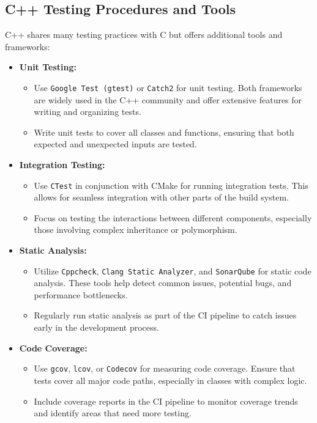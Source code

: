 \documentclass{ol-softwaremanual}
\begin{document}
\subsection{C++ Testing Procedures and Tools}

C++ shares many testing practices with C but offers additional tools and frameworks:

\begin{itemize}
    \item \textbf{Unit Testing:}
    \begin{itemize}
        \item Use \texttt{Google Test (gtest)} or \texttt{Catch2} for unit testing. Both frameworks are widely used in the C++ community and offer extensive features for writing and organizing tests.
        \item Write unit tests to cover all classes and functions, ensuring that both expected and unexpected inputs are tested.
    \end{itemize}
    
    \item \textbf{Integration Testing:}
    \begin{itemize}
        \item Use \texttt{CTest} in conjunction with CMake for running integration tests. This allows for seamless integration with other parts of the build system.
        \item Focus on testing the interactions between different components, especially those involving complex inheritance or polymorphism.
    \end{itemize}
    
    \item \textbf{Static Analysis:}
    \begin{itemize}
        \item Utilize \texttt{Cppcheck}, \texttt{Clang Static Analyzer}, and \texttt{SonarQube} for static code analysis. These tools help detect common issues, potential bugs, and performance bottlenecks.
        \item Regularly run static analysis as part of the CI pipeline to catch issues early in the development process.
    \end{itemize}
    
    \item \textbf{Code Coverage:}
    \begin{itemize}
        \item Use \texttt{gcov}, \texttt{lcov}, or \texttt{Codecov} for measuring code coverage. Ensure that tests cover all major code paths, especially in classes with complex logic.
        \item Include coverage reports in the CI pipeline to monitor coverage trends and identify areas that need more testing.
    \end{itemize}
    

\end{itemize}
\end{document}
